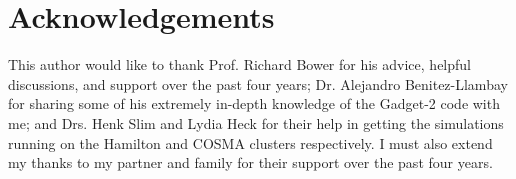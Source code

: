 \vspace{6cm}

\section*{Acknowledgements}

This author would like to thank Prof. Richard Bower for his advice, helpful discussions, and support over the past four years; Dr. Alejandro Benitez-Llambay for sharing some of his extremely in-depth knowledge of the Gadget-2 code with me; and Drs. Henk Slim and Lydia Heck for their help in getting the simulations running on the Hamilton and COSMA clusters respectively. I must also extend my thanks to my partner and family for their support over the past four years.
